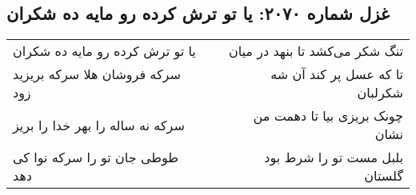\begin{center}
\section*{غزل شماره ۲۰۷۰: یا تو ترش کرده رو مایه ده شکران}
\label{sec:2070}
\begin{longtable}{l p{0.5cm} r}
یا تو ترش کرده رو مایه ده شکران
&&
تنگ شکر می‌کشد تا بنهد در میان
\\
سرکه فروشان هلا سرکه بریزید زود
&&
تا که عسل پر کند آن شه شکرلبان
\\
سرکه نه ساله را بهر خدا را بریز
&&
چونک بریزی بیا تا دهمت من نشان
\\
طوطی جان تو را سرکه نوا کی دهد
&&
بلبل مست تو را شرط بود گلستان
\\
\end{longtable}
\end{center}

